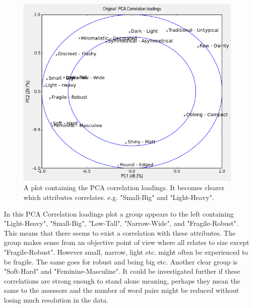 \begin{figure}[H]
\centering
\includegraphics[width = \textwidth]{Figure/PCA_correlations.png}
\caption{A plot containing the PCA correlation loadings. It becomes clearer which attributes correlates. e.g. "Small-Big" and "Light-Heavy".}
\label{fig:pca}
\end{figure}

In this PCA Correlation loadings plot a group appears to the left containing "Light-Heavy", "Small-Big",  "Low-Tall", "Narrow-Wide", and "Fragile-Robust". This means that there seems to exist a correlation with these attributes. The group makes sense from an objective point of view where all relates to size except "Fragile-Robust". However small, narrow, light etc. might often be experienced to be fragile. The same goes for robust and being big etc. Another clear group is "Soft-Hard" and "Feminine-Masculine". It could be investigated further if these correlations are strong enough to stand alone meaning, perhaps they mean the same to the assessors and the number of word pairs might be reduced without losing much resolution in the data.